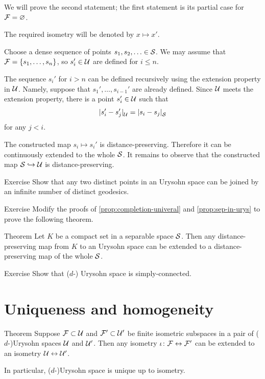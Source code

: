 We will prove the second statement;
the first statement is its partial case for $\mathcal{F}=\varnothing$.

The required isometry will be denoted by $x\mapsto x'$.

Choose a dense sequence of points $s_1,s_2,\dotsc\in\mathcal{S}$.
We may assume that $\mathcal{F}=\{s_1,\dots,s_n\}$, so $s_i'\in \mathcal{U}$ are defined for $i\le n$.

The sequence $s_i'$ for $i>n$ can be defined recursively using the extension property in $\mathcal{U}$.
Namely, suppose that $s_1',\dots,s_{i-1}'$ are already defined.
Since $\mathcal{U}$ meets the extension property, there is a point $s_i'\in \mathcal{U}$ such that
\[\dist{s_i'}{s_j'}{\spc{U}}=\dist{s_i}{s_j}{\spc{S}}\]
for any $j<i$.

The constructed map $s_i\mapsto s_i'$ is distance-preserving.
Therefore it can be continuously extended to the whole $\mathcal{S}$.
It remains to observe that the constructed map $\mathcal{S}\hookrightarrow\mathcal{U}$ is distance-preserving.
\qeds

\begin{thm}{Exercise}\label{ex:geodesics-urysohn}
Show that any two distinct points in an Urysohn space can be joined by an infinite number of distinct geodesics.
\end{thm}

\begin{thm}{Exercise}\label{ex:compact-extension}
Modify the proofs of \ref{prop:completion-univeral} and \ref{prop:sep-in-urys} to prove the following theorem.
\end{thm}

\begin{thm}{Theorem}\label{thm:compact-extension}
Let $K$ be a compact set in a separable space $\mathcal{S}$.
Then any distance-preserving map from $K$ to an Urysohn space can be extended to 
a distance-preserving map of the whole $\mathcal{S}$.
\end{thm}

\begin{thm}{Exercise}\label{ex:sc-urysohn}
Show that ($d$-) Urysohn space is simply-connected.
\end{thm}



\section{Uniqueness and homogeneity}

\begin{thm}{Theorem}\label{thm:urysohn-unique}
Suppose $\mathcal{F}\subset \mathcal{U}$ and $\mathcal{F}'\subset \mathcal{U}'$ be finite isometric subspaces in a pair of ($d$-)Urysohn spaces $\mathcal{U}$ and $\mathcal{U}'$.
Then any isometry $\iota\colon\mathcal{F}\leftrightarrow \mathcal{F}'$ can be extended to an isometry $\mathcal{U}\leftrightarrow \mathcal{U}'$.

In particular, ($d$-)Urysohn space is unique up to isometry.
\end{thm}

